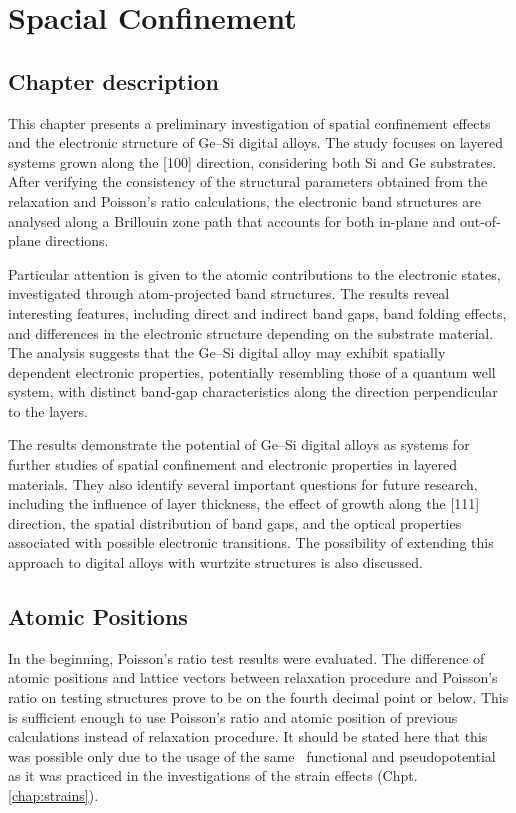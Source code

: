 \chapter{Spacial Confinement}
\label{chap:digital}

\section*{Chapter description}

This chapter presents a preliminary investigation of spatial confinement effects and the electronic structure of Ge–Si digital alloys. The study focuses on layered systems grown along the [100] direction, considering both Si and Ge substrates. After verifying the consistency of the structural parameters obtained from the relaxation and Poisson's ratio calculations, the electronic band structures are analysed along a Brillouin zone path that accounts for both in-plane and out-of-plane directions.

Particular attention is given to the atomic contributions to the electronic states, investigated through atom-projected band structures. The results reveal interesting features, including direct and indirect band gaps, band folding effects, and differences in the electronic structure depending on the substrate material. The analysis suggests that the Ge–Si digital alloy may exhibit spatially dependent electronic properties, potentially resembling those of a quantum well system, with distinct band-gap characteristics along the direction perpendicular to the layers.

The results demonstrate the potential of Ge–Si digital alloys as systems for further studies of spatial confinement and electronic properties in layered materials. They also identify several important questions for future research, including the influence of layer thickness, the effect of growth along the [111] direction, the spatial distribution of band gaps, and the optical properties associated with possible electronic transitions. The possibility of extending this approach to digital alloys with wurtzite structures is also discussed.

\ornament

\section{Atomic Positions}

In the beginning, Poisson's ratio test results were evaluated.
The difference of atomic positions and lattice vectors between relaxation procedure and Poisson's ratio on testing structures prove to be on the fourth decimal point or below.
This is sufficient enough to use Poisson's ratio and atomic position of previous calculations instead of relaxation procedure.
It should be stated here that this was possible only due to the usage of the same \XC\ functional and pseudopotential  as it was practiced in the investigations of the strain effects (Chpt. \ref{chap:strains}).

